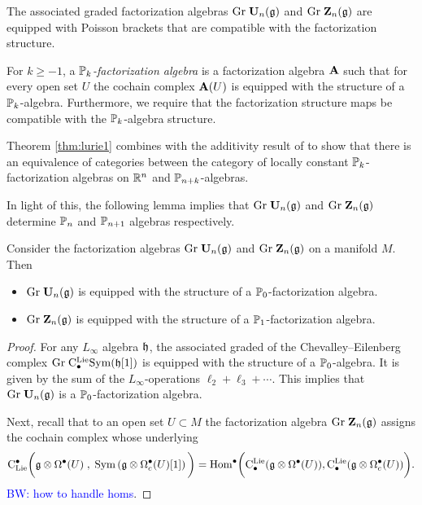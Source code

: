 \documentclass[11pt]{amsart}
\numberwithin{equation}{section}
\def\brian{\textcolor{blue}{BW: }\textcolor{blue}}
\begin{document}
The associated graded factorization algebras ${\rm Gr} \; \mathbf U_n (\mathfrak g)$ and ${\rm Gr} \; \mathbf Z_n(\mathfrak g)$ are equipped with Poisson brackets that are compatible with the factorization structure. 

For $k \geq -1$, a {\em $\mathbb P_k$-factorization algebra} is a factorization algebra $\mathbf A$ such that for every open set $U$ the cochain complex $\mathbf A(U)$ is equipped with the structure of a $\mathbb P_k$-algebra. 
Furthermore, we require that the factorization structure maps be compatible with the $\mathbb P_k$-algebra structure. 

Theorem \ref{thm:lurie1} combines with the additivity result of \cite{SafronovAdd} to show that there is an equivalence of categories between the category of locally constant $\mathbb P_k$-factorization algebras on $\mathbb R^n$ and $\mathbb P_{n+k}$-algebras.  

In light of this, the following lemma implies that ${\rm Gr} \; \mathbf U_n (\mathfrak g)$ and ${\rm Gr} \; \mathbf Z_n(\mathfrak g)$ determine $\mathbb P_n$ and $\mathbb P_{n+1}$ algebras respectively. 

\begin{lmm}
\label{lmm:pois1}
Consider the factorization algebras ${\rm Gr} \; \mathbf U_n (\mathfrak g)$ and ${\rm Gr} \; \mathbf Z_n(\mathfrak g)$ on a manifold $M$.
Then
\begin{itemize}
\item ${\rm Gr} \; \mathbf U_n (\mathfrak g)$ is equipped with the structure of a $\mathbb P_0$-factorization algebra.
\item ${\rm Gr} \; \mathbf Z_n(\mathfrak g)$ is equipped with the structure of a $\mathbb P_1$-factorization algebra.
\end{itemize}
\end{lmm}

\begin{proof}
For any $L_\infty$ algebra $\mathfrak h$, the associated graded of the Chevalley--Eilenberg complex ${\rm Gr} \; {\rm C}^{\rm Lie}_\bullet {\rm Sym} (\mathfrak h [1])$ is equipped with the structure of a $\mathbb P_0$-algebra.
It is given by the sum of the $L_\infty$-operations $\ell_2 + \ell_3 + \cdots$. 
This implies that ${\rm Gr} \; \mathbf U_n (\mathfrak g)$ is a $\mathbb P_0$-factorization algebra.

Next, recall that to an open set $U \subset M$ the factorization algebra ${\rm Gr} \; \mathbf Z_n (\mathfrak g)$ assigns the cochain complex whose underlying 
\[
{\rm C}_{{\rm Lie}}^\bullet\bigg(\mathfrak g \otimes \Omega^\bullet (U) \; , \; {\rm Sym} \left(\mathfrak g \otimes \Omega^\bullet_c(U) [1]\right) \bigg) = {\rm Hom}^\bullet \bigg({\rm C}^{\rm Lie}_\bullet(\mathfrak g \otimes \Omega^\bullet(U)) , {\rm C}^{\rm Lie}_\bullet (\mathfrak g \otimes \Omega^\bullet_c(U)) \bigg).
\]
\brian{how to handle homs}.
\end{proof}
\end{document}

